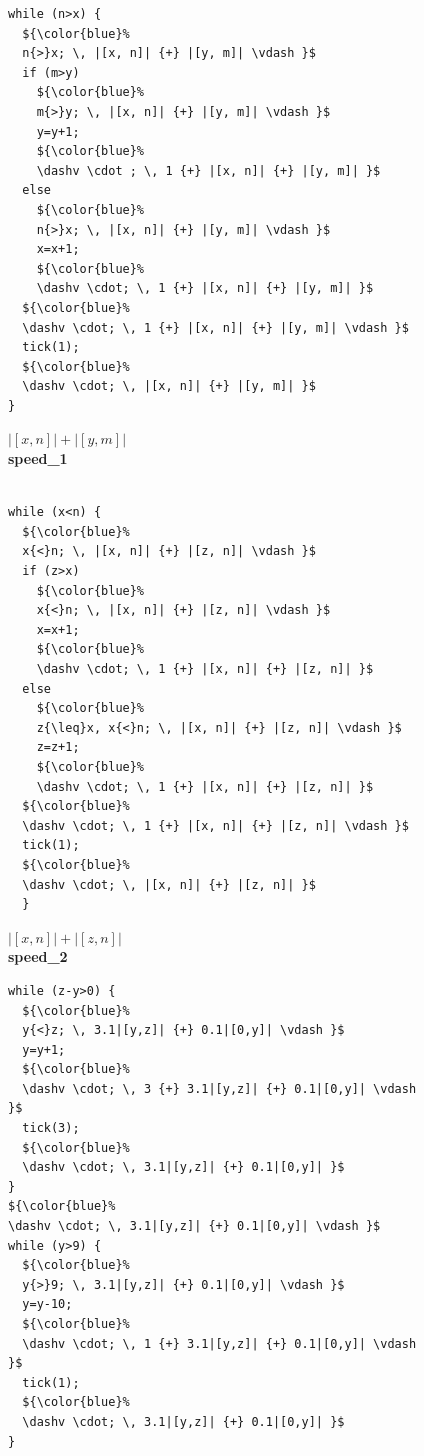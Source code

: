 \documentclass[nocopyrightspace,preprint,pldi]{sigplanconf-pldi15}
\begin{document}
\begin{figure}[t!]
 \setlength{\progwidth}{.22\linewidth}
  \centering
\hspace{-0.4cm}
  \begin{minipage}[b]{.18\linewidth}
    \begin{center}
   \begin{lstlisting}[]
while (n>x) {
  ${\color{blue}%
  n{>}x; \, |[x, n]| {+} |[y, m]| \vdash }$
  if (m>y)
    ${\color{blue}%
    m{>}y; \, |[x, n]| {+} |[y, m]| \vdash }$
    y=y+1;
    ${\color{blue}%
    \dashv \cdot ; \, 1 {+} |[x, n]| {+} |[y, m]| }$
  else
    ${\color{blue}%
    n{>}x; \, |[x, n]| {+} |[y, m]| \vdash }$
    x=x+1;
    ${\color{blue}%
    \dashv \cdot; \, 1 {+} |[x, n]| {+} |[y, m]| }$
  ${\color{blue}%
  \dashv \cdot; \, 1 {+} |[x, n]| {+} |[y, m]| \vdash }$
  tick(1);
  ${\color{blue}%
  \dashv \cdot; \, |[x, n]| {+} |[y, m]| }$
}
   \end{lstlisting}

$|[x, n]| + |[y, m]|$
\\[.4\baselineskip]
      {\bf speed\_1}
    \end{center}
  \end{minipage}
%
\hfill
%
  \begin{minipage}[b]{\progwidth}
    \begin{center}
   \begin{lstlisting}

while (x<n) {
  ${\color{blue}%
  x{<}n; \, |[x, n]| {+} |[z, n]| \vdash }$
  if (z>x)
    ${\color{blue}%
    x{<}n; \, |[x, n]| {+} |[z, n]| \vdash }$
    x=x+1;
    ${\color{blue}%
    \dashv \cdot; \, 1 {+} |[x, n]| {+} |[z, n]| }$
  else
    ${\color{blue}%
    z{\leq}x, x{<}n; \, |[x, n]| {+} |[z, n]| \vdash }$
    z=z+1;
    ${\color{blue}%
    \dashv \cdot; \, 1 {+} |[x, n]| {+} |[z, n]| }$
  ${\color{blue}%
  \dashv \cdot; \, 1 {+} |[x, n]| {+} |[z, n]| \vdash }$
  tick(1);
  ${\color{blue}%
  \dashv \cdot; \, |[x, n]| {+} |[z, n]| }$
  }
   \end{lstlisting}

$|[x, n]| + |[z, n]|$
\\[.4\baselineskip]
      {\bf speed\_2}
    \end{center}
  \end{minipage}
%
\hfill
%
  \begin{minipage}[b]{\progwidth}
    \begin{center}
   \begin{lstlisting}
while (z-y>0) {
  ${\color{blue}%
  y{<}z; \, 3.1|[y,z]| {+} 0.1|[0,y]| \vdash }$
  y=y+1;
  ${\color{blue}%
  \dashv \cdot; \, 3 {+} 3.1|[y,z]| {+} 0.1|[0,y]| \vdash }$
  tick(3);
  ${\color{blue}%
  \dashv \cdot; \, 3.1|[y,z]| {+} 0.1|[0,y]| }$
}
${\color{blue}%
\dashv \cdot; \, 3.1|[y,z]| {+} 0.1|[0,y]| \vdash }$
while (y>9) {
  ${\color{blue}%
  y{>}9; \, 3.1|[y,z]| {+} 0.1|[0,y]| \vdash }$
  y=y-10;
  ${\color{blue}%
  \dashv \cdot; \, 1 {+} 3.1|[y,z]| {+} 0.1|[0,y]| \vdash }$
  tick(1);
  ${\color{blue}%
  \dashv \cdot; \, 3.1|[y,z]| {+} 0.1|[0,y]| }$
}
   \end{lstlisting}


\end{center}
\end{minipage}
\end{figure}
\end{document}
